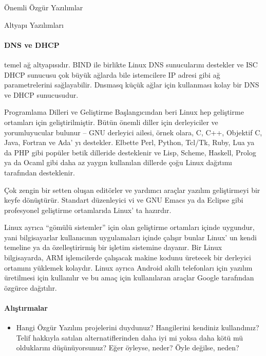 \documentclass[10pt,a5paper]{book}
\begin{document}
\begin{section}{Önemli Özgür Yazılımlar}
\begin{subsection}{Altyapı Yazılımları}
\paragraph{DNS ve DHCP}{temel ağ altyapısıdır. BIND ile birlikte Linux DNS sunucularını destekler ve ISC DHCP sunucusu çok büyük ağlarda bile istemcilere IP adresi gibi ağ parametrelerini sağlayabilir. Dnsmasq küçük ağlar için kullanması kolay bir DNS ve DHCP sunucusudur.}
\end{subsection}
\begin{subsection}{Programlama Dilleri ve Geliştirme}
Başlangıcından beri Linux hep geliştirme ortamları için geliştirilmiştir. Bütün önemli diller için derleyiciler ve yorumluyucular bulunur – GNU derleyici ailesi, örnek olara, C, C++, Objektif C, Java, Fortran ve Ada' yı destekler. Elbette Perl, Python, Tcl/Tk, Ruby, Lua ya da PHP gibi popüler betik dilleride desteklenir ve Lisp, Scheme, Haskell, Prolog ya da Ocaml gibi daha az yaygın kullanılan dillerde çoğu Linux dağıtımı tarafından desteklenir.

Çok zengin bir setten oluşan editörler ve yardımcı araçlar yazılım geliştirmeyi bir keyfe dönüştürür. Standart düzenleyici vi ve GNU Emacs ya da Eclipse gibi profesyonel geliştirme ortamlarıda Linux' ta hazırdır.

Linux ayrıca “gömülü sistemler” için olan geliştirme ortamları içinde uygundur, yani bilgisayarlar kullanıcının uygulamaları içinde çalışır bunlar Linux' un kendi temeline ya da özelleştirirmiş bir işletim sistemine dayanır. Bir Linux bilgisayarda, ARM işlemcilerde çalışacak makine kodunu üretecek bir derleyici ortamını yüklemek kolaydır. Linux ayrıca Android akıllı telefonları için yazılım üretilmesi için kullanılır ve bu amaç için kullanılaran araçlar Google tarafından özgürce dağıtılır.
\end{subsection}
\paragraph{Alıştırmalar}{
\begin{itemize}
 \item Hangi Özgür Yazılım projelerini duydunuz? Hangilerini kendiniz kullandınız? Telif hakkıyla satılan alternatiflerinden daha iyi mi yoksa daha kötü mü olduklarını düşünüyorsunuz? Eğer öyleyse, neder? Öyle değilse, neden?
\end{itemize}}
\end{section}
\end{document}
